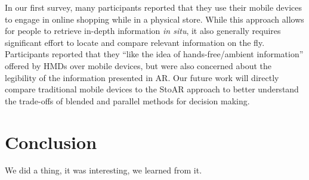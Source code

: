 In our first survey, many participants reported that they use their mobile devices to engage in online shopping while in a physical store. While this approach allows for people to retrieve in-depth information \emph{in situ}, it also generally requires significant effort to locate and compare relevant information on the fly. Participants reported that they ``like the idea of hands-free/ambient information'' offered by HMDs over mobile devices, but were also concerned about the legibility of the information presented in AR. Our future work will directly compare traditional mobile devices to the StoAR approach to better understand the trade-offs of blended and parallel methods for decision making. 

\section{Conclusion}
We did a thing, it was interesting, we learned from it.